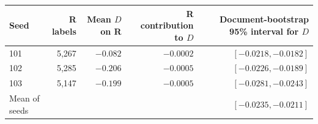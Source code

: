 \begin{tabular}{@{}lrrrr@{}}
\toprule
Seed & R labels & Mean $D$ on R & R contribution to $D$ & Document-bootstrap 95\% interval for $D$ \\
\midrule
101 & 5{,}267 & $-0.082$ & $-0.0002$ & $[-0.0218, -0.0182]$ \\
102 & 5{,}285 & $-0.206$ & $-0.0005$ & $[-0.0226, -0.0189]$ \\
103 & 5{,}147 & $-0.199$ & $-0.0005$ & $[-0.0281, -0.0243]$ \\
Mean of seeds & & & & $[-0.0235, -0.0211]$ \\
\bottomrule
\end{tabular}
